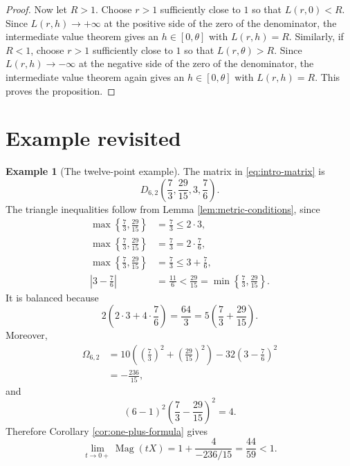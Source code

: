 \documentclass[11pt]{amsart}
\numberwithin{equation}{section}
\theoremstyle{definition}
\newtheorem{example}[theorem]{Example}
\theoremstyle{remark}
\DeclareMathOperator{\Mag}{Mag}
\begin{document}
\begin{proof}
Now let \(R>1\).  Choose \(r>1\) sufficiently close to \(1\) so that \(L(r,0)<R\).  Since \(L(r,h)\to +\infty\) at the positive side of the zero of the denominator, the intermediate value theorem gives an \(h\in[0,\theta]\) with \(L(r,h)=R\).  Similarly, if \(R<1\), choose \(r>1\) sufficiently close to \(1\) so that \(L(r,\theta)>R\).  Since \(L(r,h)\to -\infty\) at the negative side of the zero of the denominator, the intermediate value theorem again gives an \(h\in[0,\theta]\) with \(L(r,h)=R\).  This proves the proposition.
\end{proof}

\section{Example revisited}

\begin{example}[The twelve-point example]\label{ex:twelve-point}
The matrix in \eqref{eq:intro-matrix} is
\begin{equation}\label{eq:example-as-two-chunk}
D_{6,2}\left(\frac{7}{3},\frac{29}{15},3,\frac{7}{6}\right).
\end{equation}
The triangle inequalities follow from Lemma \ref{lem:metric-conditions}, since
\begin{align}
\max\left\{\frac{7}{3},\frac{29}{15}\right\}&=\frac{7}{3}\leq 2\cdot 3,
\label{eq:example-triangle-one}\\
\max\left\{\frac{7}{3},\frac{29}{15}\right\}&=\frac{7}{3}=2\cdot \frac{7}{6},
\label{eq:example-triangle-two}\\
\max\left\{\frac{7}{3},\frac{29}{15}\right\}&=\frac{7}{3}\leq 3+\frac{7}{6},
\label{eq:example-triangle-three}\\
\left|3-\frac{7}{6}\right|&=\frac{11}{6}<\frac{29}{15}
=\min\left\{\frac{7}{3},\frac{29}{15}\right\}.
\label{eq:example-triangle-four}
\end{align}
It is balanced because
\begin{equation}\label{eq:example-balanced}
2\left(2\cdot 3+4\cdot \frac{7}{6}\right)
=\frac{64}{3}
=5\left(\frac{7}{3}+\frac{29}{15}\right).
\end{equation}
Moreover,
\begin{align}
\Omega_{6,2}
&=10\left(\left(\frac{7}{3}\right)^2+
\left(\frac{29}{15}\right)^2\right)
-32\left(3-\frac{7}{6}\right)^2
\label{eq:example-Omega-computation}\\
&=-\frac{236}{15},
\label{eq:example-Omega-value}
\end{align}
and
\begin{equation}\label{eq:example-numerator-computation}
(6-1)^2\left(\frac{7}{3}-\frac{29}{15}\right)^2=4.
\end{equation}
Therefore Corollary \ref{cor:one-plus-formula} gives
\begin{equation}\label{eq:example-final-limit}
\lim_{t\to 0+}\Mag(tX)
=1+\frac{4}{-236/15}
=\frac{44}{59}<1.
\end{equation}
\end{example}
\end{document}
